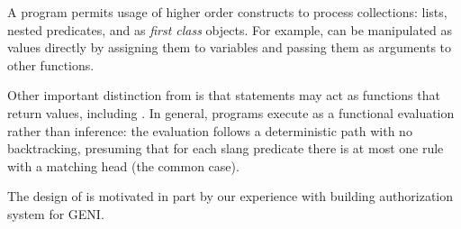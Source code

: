 A  program permits usage of higher order constructs to process
collections: lists, nested predicates, and  as \emph{first class}
objects. For example,  can be manipulated as values directly by
assigning them to variables and passing them as arguments to other functions.

Other important distinction from  is that 
statements may act as functions that return values, including
. In general,  programs execute as a
functional evaluation rather than inference: the evaluation follows a
deterministic path with no backtracking, presuming that for each slang
predicate there is at most one rule with a matching head (the common case).

The design of  is motivated in part by our experience with
building authorization system for GENI.
